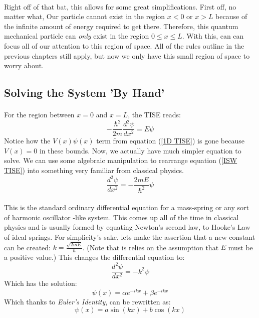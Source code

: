 \documentclass[12pt,letterpaper]{book}
\begin{document}
\begin{center}
\end{center}

\paragraph*{}Right off of that bat, this allows for some great simplifications. First off, no matter what, Our particle cannot exist in the region $x < 0$ or $x > L$ because of the infinite amount of energy required to get there. Therefore, this quantum mechanical particle can \textit{only} exist in the region $0 \leq x \leq L$. With this, can can focus all of our attention to this region of space. All of the rules outline in the previous chapters still apply, but now we only have this small region of space to worry about.


\subsection*{Solving the System 'By Hand'}

\paragraph*{}For the region between $x = 0$ and $x = L$, the TISE reads:
\begin{equation}
\label{ISW TISE}
-\frac{\hbar^2}{2m}\frac{d^2 \psi}{dx^2} = E\psi
\end{equation}
Notice how the $V(x)\psi(x)$ term from equation (\ref{1D TISE}) is gone because $V(x) = 0$ in these bounds. Now, we actually have much simpler equation to solve. We can use some algebraic manipulation to rearrange equation (\ref{ISW TISE}) into something very familiar from classical physics.
\begin{equation}
\label{HO ODE}
\frac{d^2 \psi}{dx^2} = -\frac{2mE}{\hbar^2}\psi
\end{equation}

\paragraph{}This is the standard ordinary differential equation for a mass-spring or any sort of harmonic oscillator -like system. This comes up all of the time in classical physics and is usually formed by equating Newton's second law, to Hooke's Law of ideal springs.  For simplicity's sake, lets make the assertion that a new constant can be created: $k = \frac{\sqrt{2mE}}{\hbar}$. (Note that is relies on the assumption that $E$ must be a positive value.) This changes the differential equation to:
\begin{equation}
\frac{d^2 \psi}{dx^2} = -k^2\psi
\end{equation}
Which has the solution:
\begin{equation}
\psi(x) = \alpha e^{+ikx} + \beta e^{-ikx}
\end{equation}
Which thanks to \textit{Euler's Identity}, can be rewritten as:
\begin{equation}
\psi(x) = a \sin(kx) + b \cos(kx)
\end{equation}
\end{document}
